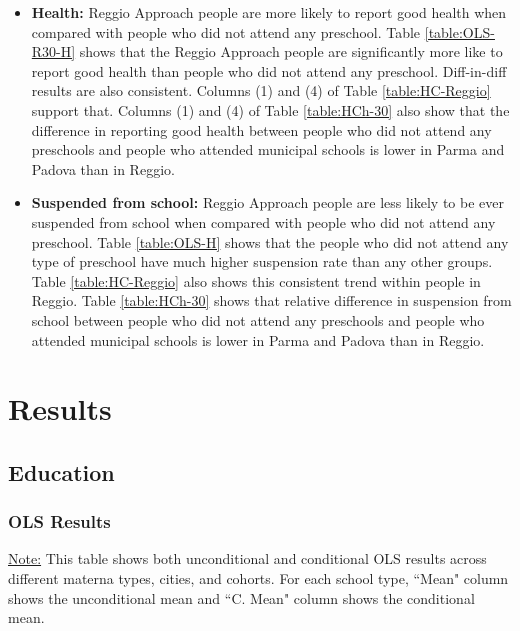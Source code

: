 \documentclass[11pt]{article}
\begin{document}
\begin{itemize}
\item \textbf{Health:} Reggio Approach people are more likely to report good health when compared with people who did not attend any preschool. Table \ref{table:OLS-R30-H} shows that the Reggio Approach people are significantly more like to report good health than people who did not attend any preschool. Diff-in-diff results are also consistent. Columns (1) and (4) of Table \ref{table:HC-Reggio} support that. Columns (1) and (4) of Table \ref{table:HCh-30} also show that the difference in reporting good health between people who did not attend any preschools and people who attended municipal schools is lower in Parma and Padova than in Reggio. 

\item \textbf{Suspended from school:} Reggio Approach people are less likely to be ever suspended from school when compared with people who did not attend any preschool. Table \ref{table:OLS-H} shows that the people who did not attend any type of preschool have much higher suspension rate than any other groups. Table \ref{table:HC-Reggio} also shows this consistent trend within people in Reggio. Table \ref{table:HCh-30} shows that relative difference in suspension from school between people who did not attend any preschools and people who attended municipal schools is lower in Parma and Padova than in Reggio. 
\end{itemize}

\appendix

\section{Results}
\subsection{Education}

\subsubsection{OLS Results}
\begin{table}[H]
\begin{center}
	\caption{OLS Results, Restricting to Reggio and Age-30 Cohort} \label{table:OLS-E}
	\end{center}
\footnotesize
\underline{Note:} This table shows both unconditional and conditional OLS results across different materna types, cities, and cohorts. For each school type, ``Mean" column shows the unconditional mean and ``C. Mean" column shows the conditional mean. 

\end{table}
\end{document}
